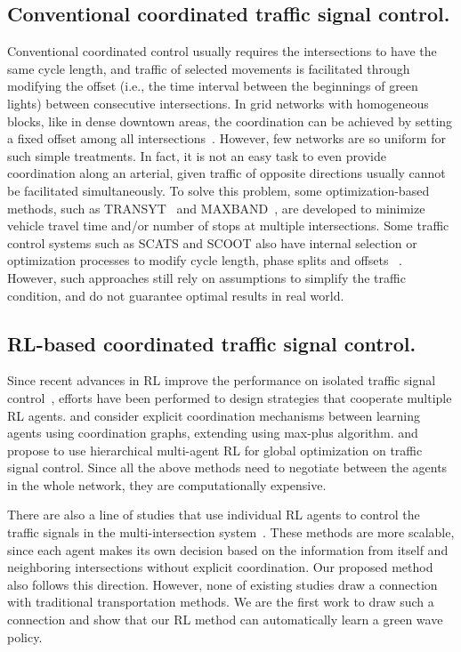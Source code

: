 \subsection{Conventional coordinated traffic signal control.}
Conventional coordinated control usually requires the intersections to have the same cycle length, and traffic of selected movements is facilitated through modifying the offset (i.e., the time interval between the beginnings of green lights) between consecutive intersections. In grid networks with homogeneous blocks, like in dense downtown areas, the coordination can be achieved by setting a fixed offset among all intersections~\cite{urbanik2015signal}. However, few networks are so uniform for such simple treatments. In fact, it is not an easy task to even provide coordination along an arterial, given traffic of opposite directions usually cannot be facilitated simultaneously. To solve this problem, some optimization-based methods, such as TRANSYT~\cite{robertson1969transyt} and MAXBAND~\cite{little1981maxband}, are developed to minimize vehicle travel time and/or number of stops at multiple intersections. 
Some traffic control systems such as SCATS and SCOOT also have internal selection or optimization processes to modify cycle length, phase splits and offsets ~\cite{kergaye2010comparative}. However, such approaches still rely on assumptions to simplify the traffic condition, and do not guarantee optimal results in real world.

\subsection{RL-based coordinated traffic signal control.}
Since recent advances in RL  improve the performance on isolated traffic signal control~\cite{VaOl16,wei2018intellilight}, efforts have been performed to design strategies that cooperate multiple RL agents. \cite{KWBV08} and \cite{VaOl16} consider explicit coordination mechanisms between learning agents using coordination graphs, extending \cite{Wier00} using max-plus algorithm. \cite{yang2005intelligent} and~\cite{france2003multiagent} propose to use hierarchical multi-agent RL for global optimization on traffic signal control. Since all the above methods need to negotiate between the agents in the whole network,  they are computationally expensive. 

There are also a line of studies that use individual RL agents to control the traffic signals in the multi-intersection system~\cite{ElAA13,ALUK10,da2006adaptive}. These methods are more scalable, since each agent makes its own decision based on the information from itself and neighboring intersections without explicit coordination. Our proposed method also follows this direction. However, none of existing studies draw a connection with traditional transportation methods. We are the first work to draw such a connection and show that our RL method can automatically learn a green wave policy.

